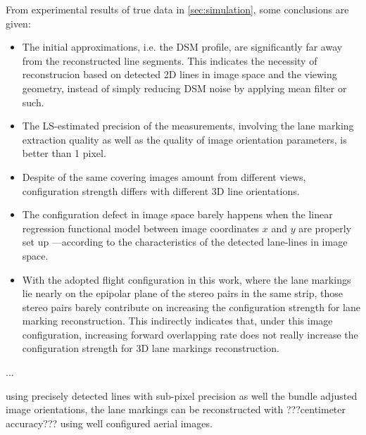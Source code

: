 From experimental results of true data in \cref{sec:simulation}, some conclusions are given:
\begin{itemize}
	\item The initial approximations, i.e. the DSM profile, are significantly far away from the reconstructed line segments. This indicates the necessity of reconstrucion based on detected 2D lines in image space and the viewing geometry, instead of simply reducing DSM noise by applying mean filter or such.
	
	\item The LS-estimated precision of the measurements, involving the lane marking extraction quality as well as the quality of image orientation parameters, is better than 1 pixel.
	
	\item Despite of the same covering images amount from different views, configuration strength differs with different 3D line orientations.
	
	\item The configuration defect in image space %
	barely happens when the linear regression functional model between image coordinates $x$ and $y$ are properly set up ---according to the characteristics of the detected lane-lines in image space.
	
	\item  %
	With the adopted flight configuration in this work, where the lane markings lie nearly on the epipolar plane of the  stereo pairs in the same strip, those stereo pairs barely contribute on increasing the configuration strength for lane marking reconstruction. 
	This indirectly indicates that, under this image configuration, increasing forward overlapping rate does not really increase the configuration strength for 3D lane markings reconstruction. 
	
\end{itemize}


...

using precisely detected lines with sub-pixel precision as well the bundle adjusted image orientations, the lane markings can be reconstructed with ???centimeter accuracy??? using well configured aerial images.


